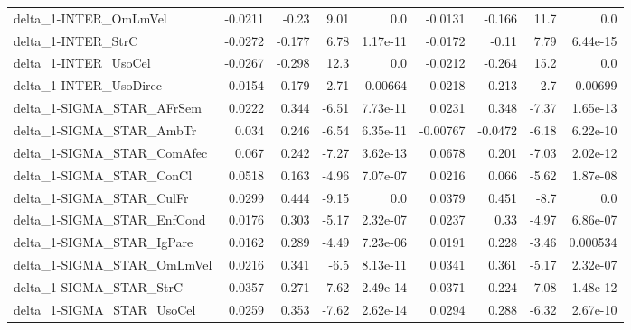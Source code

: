 \begin{tabular}{lrrrrrrrr}
delta\_1-INTER\_OmLmVel                  &     -0.0211 &        -0.23 &    9.01 &      0.0 &    -0.0131 &      -0.166 &         11.7 &           0.0 \\
delta\_1-INTER\_StrC                     &     -0.0272 &       -0.177 &    6.78 & 1.17e-11 &    -0.0172 &       -0.11 &         7.79 &      6.44e-15 \\
delta\_1-INTER\_UsoCel                   &     -0.0267 &       -0.298 &    12.3 &      0.0 &    -0.0212 &      -0.264 &         15.2 &           0.0 \\
delta\_1-INTER\_UsoDirec                 &      0.0154 &        0.179 &    2.71 &  0.00664 &     0.0218 &       0.213 &          2.7 &       0.00699 \\
delta\_1-SIGMA\_STAR\_AFrSem              &      0.0222 &        0.344 &   -6.51 & 7.73e-11 &     0.0231 &       0.348 &        -7.37 &      1.65e-13 \\
delta\_1-SIGMA\_STAR\_AmbTr               &       0.034 &        0.246 &   -6.54 & 6.35e-11 &   -0.00767 &     -0.0472 &        -6.18 &      6.22e-10 \\
delta\_1-SIGMA\_STAR\_ComAfec             &       0.067 &        0.242 &   -7.27 & 3.62e-13 &     0.0678 &       0.201 &        -7.03 &      2.02e-12 \\
delta\_1-SIGMA\_STAR\_ConCl               &      0.0518 &        0.163 &   -4.96 & 7.07e-07 &     0.0216 &       0.066 &        -5.62 &      1.87e-08 \\
delta\_1-SIGMA\_STAR\_CulFr               &      0.0299 &        0.444 &   -9.15 &      0.0 &     0.0379 &       0.451 &         -8.7 &           0.0 \\
delta\_1-SIGMA\_STAR\_EnfCond             &      0.0176 &        0.303 &   -5.17 & 2.32e-07 &     0.0237 &        0.33 &        -4.97 &      6.86e-07 \\
delta\_1-SIGMA\_STAR\_IgPare              &      0.0162 &        0.289 &   -4.49 & 7.23e-06 &     0.0191 &       0.228 &        -3.46 &      0.000534 \\
delta\_1-SIGMA\_STAR\_OmLmVel             &      0.0216 &        0.341 &    -6.5 & 8.13e-11 &     0.0341 &       0.361 &        -5.17 &      2.32e-07 \\
delta\_1-SIGMA\_STAR\_StrC                &      0.0357 &        0.271 &   -7.62 & 2.49e-14 &     0.0371 &       0.224 &        -7.08 &      1.48e-12 \\
delta\_1-SIGMA\_STAR\_UsoCel              &      0.0259 &        0.353 &   -7.62 & 2.62e-14 &     0.0294 &       0.288 &        -6.32 &      2.67e-10 \\

\end{tabular}
